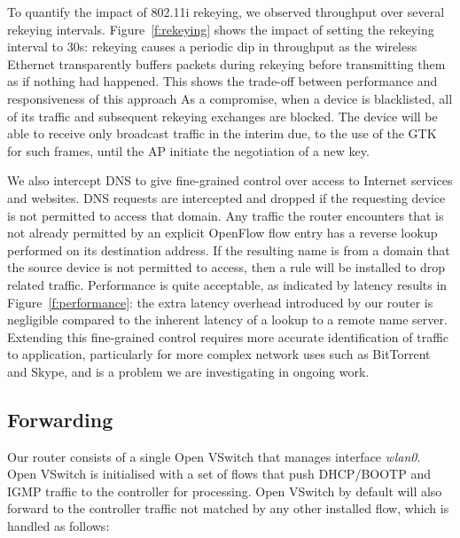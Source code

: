 To quantify the impact of 802.11i rekeying, we observed throughput over several
rekeying intervals.  Figure~\ref{f:rekeying} shows the impact of setting the
rekeying interval to 30s: rekeying causes a periodic dip in throughput as the
wireless Ethernet transparently buffers packets during rekeying before
transmitting them as if nothing had happened.  This shows the trade-off between
performance and responsiveness of this approach
As a compromise, when a device is blacklisted, all of its traffic and subsequent
rekeying exchanges are blocked.
The device will be able to receive only broadcast traffic in the interim due, to
the use of the GTK for such frames, until the AP initiate the negotiation of a
new key.  

We also intercept DNS to give fine-grained control over access to Internet
services and websites.  DNS requests are intercepted and dropped if the
requesting device is not permitted to access that domain.  Any traffic the
router encounters that is not already permitted by an explicit OpenFlow flow
entry has a reverse lookup performed on its destination address.  If the
resulting name is from a domain that the source device is not permitted to
access, then a rule will be installed to drop related traffic.  Performance is
quite acceptable, as indicated by latency results in Figure~\ref{f:performance}:
the extra latency overhead introduced by our router is negligible compared to
the inherent latency of a lookup to a remote name server.  Extending this
fine-grained control requires more accurate identification of traffic to
application, particularly for more complex network uses such as BitTorrent and
Skype, and is a problem we are investigating in ongoing work.

\subsection{Forwarding} \label{s:forwarding}
 
Our router consists of a single Open VSwitch that manages interface
\emph{wlan0}.  Open VSwitch is initialised with a set of flows that push
DHCP/BOOTP and IGMP traffic to the controller for processing.
Open VSwitch by default will also forward to the controller traffic not matched
by any other installed flow, which is handled as follows:

